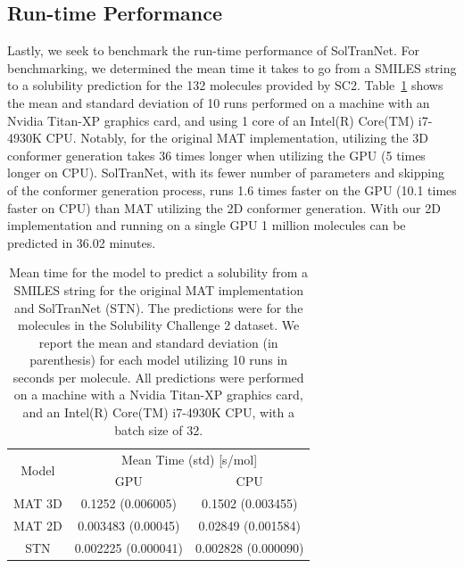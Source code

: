 \documentclass[journal=jmcmar,manuscript=article]{achemso}
\begin{document}
\subsection{Run-time Performance}

Lastly, we seek to benchmark the run-time performance of SolTranNet.
For benchmarking, we determined the mean time it takes to go from a SMILES string to a solubility prediction for the 132 molecules provided by SC2.
Table~\ref{tab:timings} shows the mean and standard deviation of 10 runs performed on a machine with an Nvidia Titan-XP graphics card, and using 1 core of an Intel(R) Core(TM) i7-4930K CPU.
Notably, for the original MAT implementation, utilizing the 3D conformer generation takes 36 times longer when utilizing the GPU (5 times longer on CPU).
SolTranNet, with its fewer number of parameters and skipping of the conformer generation process, runs 1.6 times faster on the GPU (10.1 times faster on CPU) than MAT utilizing the 2D conformer generation.
With our 2D implementation and running on a single GPU 1 million molecules can be predicted in 36.02 minutes.


\begin{table}
    \begin{tabular}{|c|c|c|}
        \hline
        \multirow{2}{*}{Model}    & \multicolumn{2}{c|}{Mean Time (std) [s/mol]} \\ 
        \cline{2-3}
          &  GPU & CPU \\
         \hline
         MAT 3D & 0.1252 (0.006005) & 0.1502 (0.003455) \\
         MAT 2D & 0.003483 (0.00045) & 0.02849 (0.001584) \\
         STN & 0.002225 (0.000041) & 0.002828 (0.000090)\\
         \hline
    \end{tabular}
    \caption{Mean time for the model to predict a solubility from a SMILES string for the original MAT implementation and SolTranNet (STN). The predictions were for the molecules in the Solubility Challenge 2 dataset. We report the mean and standard deviation (in parenthesis) for each model utilizing 10 runs in seconds per molecule. All predictions were performed on a machine with a Nvidia Titan-XP graphics card, and an Intel(R) Core(TM) i7-4930K CPU, with a batch size of 32.}
    \label{tab:timings}
\end{table}
\end{document}
